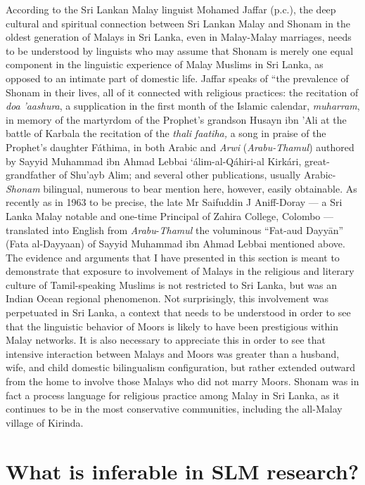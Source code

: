 According to the Sri Lankan Malay linguist Mohamed Jaffar (p.c.), the deep cultural and spiritual connection between Sri Lankan Malay and Shonam in the oldest generation of Malays in Sri Lanka, even in Malay-Malay marriages, needs to be understood by linguists who may assume that Shonam is merely one equal component in the linguistic experience of Malay Muslims in Sri Lanka, as opposed to an intimate part of domestic life. Jaffar speaks of ``the prevalence of Shonam in their lives, all of it connected with religious practices: the recitation of \textit{doa} \textit{'aashura}, a supplication in the first month of the Islamic calendar, \textit{muharram}, in memory of the martyrdom of the Prophet's grandson Husayn ibn 'Ali at the battle of Karbala the recitation of the \textit{thali }\textit{faatiha, }a song in praise of the Prophet's daughter F\'athima, in both Arabic and \textit{Arwi} (\textit{Arabu-Thamul}) authored by Sayyid Muhammad ibn Ahmad Lebbai `\'alim-al-Q\'ahiri-al Kirk\'ari, great-grandfather of Shu'ayb Alim; and several other publications, usually Arabic-\textit{Shonam} bilingual, numerous to bear mention here, however, easily obtainable. As recently as in 1963 to be precise, the late Mr Saifuddin J Aniff-Doray --- a Sri Lanka Malay notable and one-time Principal of Zahira College, Colombo --- translated into English from \textit{Arabu}{}-\textit{Thamul} the voluminous ``Fat-aud Dayy\=an'' (Fata al-Dayyaan) of Sayyid Muhammad ibn Ahmad Lebbai mentioned above. The evidence and arguments that I have presented in this section is meant to demonstrate that exposure to involvement of Malays in the religious and literary culture of Tamil-speaking Muslims is not restricted to Sri Lanka, but was an Indian Ocean regional phenomenon. Not surprisingly, this involvement was perpetuated in  Sri Lanka, a context that needs to be understood in order to see that the linguistic behavior of Moors is likely to have been prestigious within Malay networks. It is also necessary to appreciate this in order to see that intensive interaction between Malays and Moors was greater than a husband, wife, and child domestic bilingualism configuration, but rather extended outward from the home to involve those Malays who did not marry Moors. Shonam was in fact a process language for religious practice among Malay in Sri Lanka, as it continues to be in the most conservative communities, including the all-Malay village of Kirinda.

\section{What is inferable in SLM research?}%

